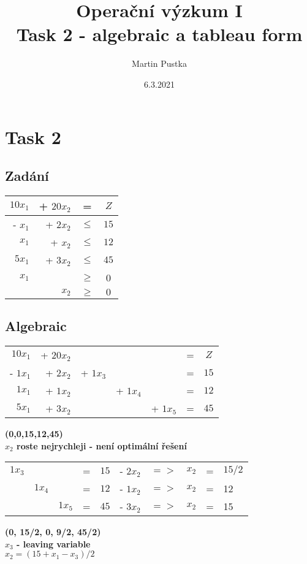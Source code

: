 \documentclass{article}%
\title{Operační výzkum I\\
    \large Task 2 - algebraic a tableau form}
\date{6.3.2021}
\author{Martin Pustka}
\begin{document}
\maketitle
\newpage

\section{Task 2}

\subsection{Zadání}
\begin{tabular}{rrcc}
    $10x_1$     & + $20x_2$  & =      & $Z$   \\
    \midrule
    - $x_1$     & + $2x_2$   & $\leq$ & $15$  \\
    $x_1$       & + $x_2$    & $\leq$ & $12$  \\
    $5x_1$      & + $3x_2$   & $\leq$ & $45$  \\
    \midrule
    $x_1$ &  & $\geq$ & 0 \\
    &  $x_2$ & $\geq$ & $0$ \\
\end{tabular}

\newpage
\subsection{Algebraic}

\begin{tabular}{rrrrrcc}
    $10x_1$   & + $20x_2$  &          &          &          & = & $Z$   \\
    - $1x_1$  & + $2x_2$   & + $1x_3$ &          &          & = & $15$  \\
    $1x_1$    & + $1x_2$   &          & + $1x_4$ &          & = & $12$  \\
    $5x_1$    & + $3x_2$   &          &          & + $1x_5$ & = & $45$  \\
\end{tabular}
\newline
\textbf{
    (0,0,15,12,45) \\
    $x_2$ roste nejrychleji - není optimální řešení\\
}

\begin{tabular}{rrrcclrrcl}
    $1x_3$ & & & =   & $15$ & - $2x_2$ & $=>$ & $x_2$ & = & $15/2$ \\
    & $1x_4$ & & =   & $12$ & - $1x_2$ & $=>$ & $x_2$ & = & 12 \\
    & & $1x_5$ & =   & $45$ & - $3x_2$ & $=>$ & $x_2$ & = & 15 \\
\end{tabular}
\newline
\textbf{
    (0, 15/2, 0, 9/2, 45/2) \\
    $x_3$ - leaving variable \\
    $x_2 = (15 + x_1 - x_3)/2$ \\
}
\end{document}
